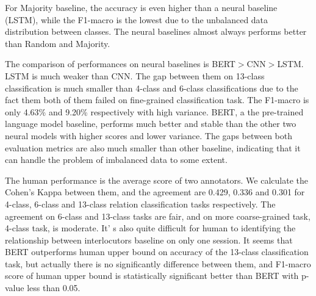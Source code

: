For Majority baseline, the accuracy is even higher than a neural baseline (LSTM), while the F1-macro is the lowest due to the unbalanced data distribution between classes. The neural baselines almost always performs better than Random and Majority.

The comparison of performances on neural baselines is BERT$>$CNN$>$LSTM. LSTM is much weaker than CNN. The gap between them on 13-class classification is much smaller than 4-class and 6-class classifications due to the fact them both of them failed on fine-grained classification task. The F1-macro is only 4.63\% and 9.20\% respectively with high variance.
BERT, a the pre-trained language model baseline, performs much better and stable than the other two neural models with higher scores and lower variance. The gaps between both evaluation metrics are also much smaller than other baseline, indicating that it can handle the problem of imbalanced data to some extent.

The human performance is the average score of two annotators. We calculate the Cohen's Kappa between them, and the agreement are 0.429, 0.336 and 0.301 for 4-class, 6-class and 13-class relation classification tasks respectively. The agreement on 6-class and 13-class tasks are fair, and on more coarse-grained task, 4-class task, is moderate. It' s also quite difficult for human to identifying the relationship between interlocutors baseline on only one session. It seems that BERT outperforms human upper bound on accuracy of the 13-class classification task, but actually there is no significantly difference between them, and F1-macro score of human upper bound is statistically significant better than BERT with p-value less than 0.05.




